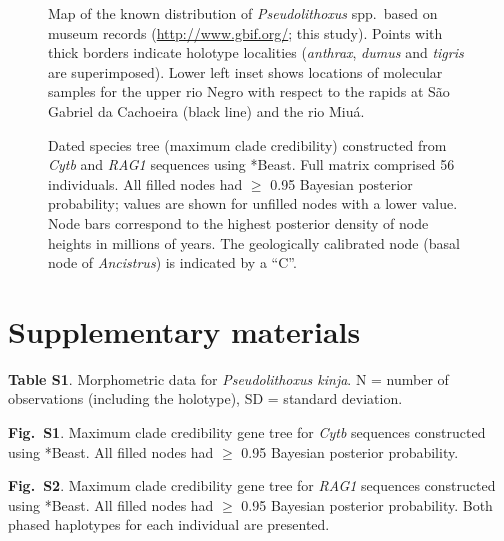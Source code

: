 \documentclass[12pt]{article}
\begin{document}
\begin{figure}[!htbp]
\caption{Map of the known distribution of \emph{Pseudolithoxus} spp.\ based on museum records (\href{http://www.gbif.org/}{http://www.gbif.org/}; this study). %
Points with thick borders indicate holotype localities (\emph{anthrax}, \emph{dumus} and \emph{tigris} are superimposed). %
 Lower left inset shows locations of molecular samples for the upper rio Negro with respect to the rapids at São Gabriel da Cachoeira (black line) and the rio Miuá.}
\begin{center}
\end{center}
\label{fig:map}
\end{figure}

\begin{figure}[!htbp]
\caption{Dated species tree (maximum clade credibility) constructed from \emph{Cytb} and \emph{RAG1} sequences using *Beast. %
Full matrix comprised 56 individuals. %
All filled nodes had $\geq$ 0.95 Bayesian posterior probability; values are shown for unfilled nodes with a lower value. %
Node bars correspond to the highest posterior density of node heights in millions of years. %
The geologically calibrated node (basal node of \emph{Ancistrus}) is indicated by a ``C''.}
\begin{center}
\end{center}
\label{fig:tree}
\end{figure}



\newpage
\section*{Supplementary materials}

\noindent \textbf{Table S1}. Morphometric data for \emph{Pseudolithoxus kinja}. %
N = number of observations (including the holotype), SD = standard deviation.%
\bigskip

\noindent \textbf{Fig.\ S1}. Maximum clade credibility gene tree for \emph{Cytb} sequences constructed using *Beast. %
All filled nodes had $\geq$ 0.95 Bayesian posterior probability.%
\bigskip

\noindent \textbf{Fig.\ S2}. Maximum clade credibility gene tree for \emph{RAG1} sequences constructed using *Beast. %
All filled nodes had $\geq$ 0.95 Bayesian posterior probability. %
Both phased haplotypes for each individual are presented.%
\bigskip
\newpage 
\end{document}
